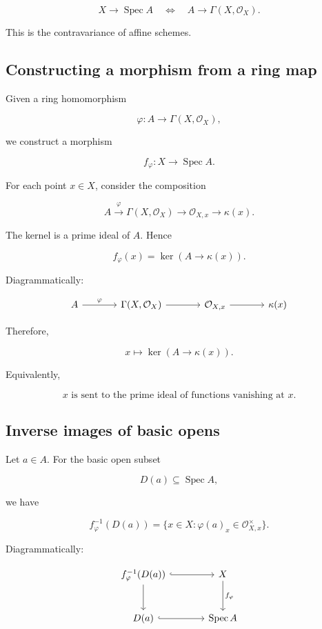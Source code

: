 \documentclass[12pt,a4paper]{article}
\newcommand{\OO}{\mathcal{O}}
\newcommand{\Spec}{\operatorname{Spec}}
\theoremstyle{notespace}
\begin{document}
\[
\boxed{
	X\to\Spec A
}
\quad\Longleftrightarrow\quad
\boxed{
	A\to\Gamma(X,\OO_X).
}
\]

This is the contravariance of affine schemes.

\subsection{Constructing a morphism from a ring map}

Given a ring homomorphism

\[
\varphi:A\to\Gamma(X,\OO_X),
\]

we construct a morphism

\[
f_\varphi:X\to\Spec A.
\]

For each point \(x\in X\), consider the composition

\[
A
\xrightarrow{\varphi}
\Gamma(X,\OO_X)
\longrightarrow
\OO_{X,x}
\longrightarrow
\kappa(x).
\]

The kernel is a prime ideal of \(A\). Hence

\[
f_\varphi(x)
=
\ker(A\to\kappa(x)).
\]

Diagrammatically:

\[
\begin{tikzcd}[column sep=large]
	A \arrow[r,"\varphi"]
	&
	\Gamma(X,\OO_X)
	\arrow[r]
	&
	\OO_{X,x}
	\arrow[r]
	&
	\kappa(x)
\end{tikzcd}
\]

Therefore,

\[
\boxed{
	x\longmapsto \ker(A\to\kappa(x)).
}
\]

Equivalently,

\[
\boxed{
	x
	\text{ is sent to the prime ideal of functions vanishing at }x.
}
\]

\subsection{Inverse images of basic opens}

Let \(a\in A\). For the basic open subset

\[
D(a)\subseteq \Spec A,
\]

we have

\[
f_\varphi^{-1}(D(a))
=
\{x\in X:\varphi(a)_x\in\OO_{X,x}^{\times}\}.
\]

Diagrammatically:

\[
\begin{tikzcd}[column sep=large,row sep=large]
	f_\varphi^{-1}(D(a)) \arrow[r,hook] \arrow[d]
	&
	X \arrow[d,"f_\varphi"]
	\\
	D(a) \arrow[r,hook]
	&
	\Spec A
\end{tikzcd}
\]
\end{document}
